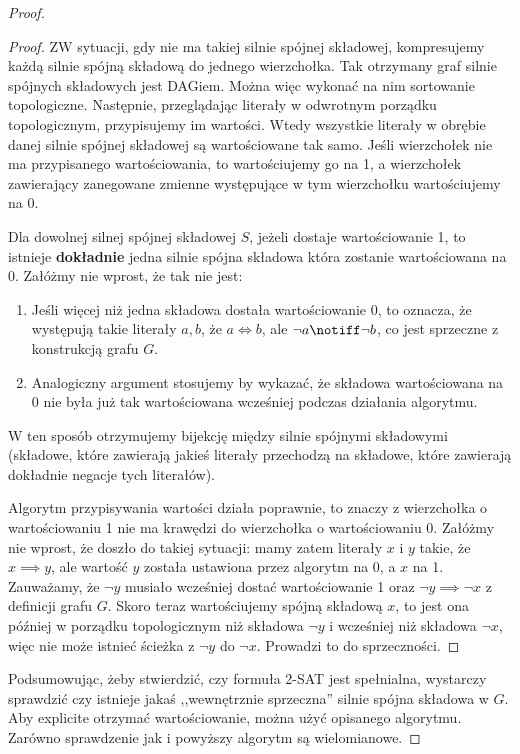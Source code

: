 \begin{proof}
\begin{proof}
        ZW sytuacji, gdy nie ma takiej silnie spójnej składowej, kompresujemy każdą silnie spójną składową do jednego wierzchołka. Tak otrzymany graf silnie spójnych składowych jest DAGiem.
        Można więc wykonać na nim sortowanie topologiczne. Następnie, przeglądając literały w odwrotnym porządku topologicznym, przypisujemy im wartości. Wtedy wszystkie literały w obrębie danej silnie spójnej składowej są wartościowane tak samo.
        Jeśli wierzchołek nie ma przypisanego wartościowania, to wartościujemy go na 1, a wierzchołek zawierający zanegowane zmienne występujące w tym wierzchołku wartościujemy na 0. 

        Dla dowolnej silnej spójnej składowej \(S\), jeżeli dostaje wartościowanie 1, to istnieje \textbf{dokładnie} jedna silnie spójna składowa która zostanie wartościowana na 0. Załóżmy nie wprost, że tak nie jest:
        \begin{enumerate}
            \item Jeśli więcej niż jedna składowa dostała wartościowanie 0, to oznacza, że występują takie literały \(a, b\), że \(a \iff b\), ale \(\neg a \notiff \neg b\), co jest sprzeczne z konstrukcją grafu \(G\). 
            \item Analogiczny argument stosujemy by wykazać, że składowa wartościowana na 0 nie była już tak wartościowana wcześniej podczas działania algorytmu. 
        \end{enumerate}

        W ten sposób otrzymujemy bijekcję między silnie spójnymi składowymi (składowe, które zawierają jakieś literały przechodzą na składowe, które zawierają dokładnie negacje tych literałów). 

        Algorytm przypisywania wartości działa poprawnie, to znaczy z wierzchołka o wartościowaniu 1 nie ma krawędzi do wierzchołka o wartościowaniu 0.
        Załóżmy nie wprost, że doszło do takiej sytuacji: mamy zatem literały \(x\) i \(y\) takie, że \( x \implies y\), ale wartość \(y\) została ustawiona przez algorytm na 0, a \(x\) na 1. Zauważamy, że \(\neg y\) musiało wcześniej dostać wartościowanie 1 oraz \( \neg y \implies \neg x\) z definicji grafu \(G\).
        Skoro teraz wartościujemy spójną składową \(x\), to jest ona później w porządku topologicznym niż składowa \( \neg y\) i wcześniej niż składowa \( \neg x\), więc nie może istnieć ścieżka z \( \neg y\) do \( \neg x\). Prowadzi to do sprzeczności.
    \end{proof}

    Podsumowując, żeby stwierdzić, czy formuła \textsc{2-SAT} jest spełnialna, wystarczy sprawdzić czy istnieje jakaś ,,wewnętrznie sprzeczna'' silnie spójna składowa w \(G\). Aby explicite otrzymać wartościowanie, można użyć opisanego algorytmu. Zarówno sprawdzenie jak i powyższy algorytm są wielomianowe. 
\end{proof}